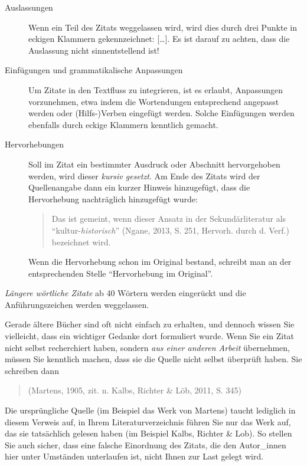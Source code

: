 \documentclass[ngerman,bibliography=totoc,oneside,12pt,a4paper]{scrbook}
\begin{document}
\begin{description}
\item[Auslassungen]
Wenn ein Teil des Zitats weggelassen wird, wird dies durch drei Punkte
in eckigen Klammern gekennzeichnet: {[}\ldots{}{]}. Es ist darauf zu
achten, dass die Auslassung nicht sinnentstellend ist!
\item[Einfügungen und grammatikalische Anpassungen]
Um Zitate in den Textfluss zu integrieren, ist es erlaubt, Anpassungen
vorzunehmen, etwa indem die Wortendungen entsprechend angepasst werden
oder (Hilfs-)Verben eingefügt werden. Solche Einfügungen werden
ebenfalls durch eckige Klammern kenntlich gemacht.
\item[Hervorhebungen]
Soll im Zitat ein bestimmter Ausdruck oder Abschnitt hervorgehoben
werden, wird dieser \emph{kursiv gesetzt}. Am Ende des Zitats wird der
Quellenangabe dann ein kurzer Hinweis hinzugefügt, dass die Hervorhebung
nachträglich hinzugefügt wurde:

\begin{quote}
Das ist gemeint, wenn dieser Ansatz in der Sekundärliteratur als
\enquote{kultur-\emph{historisch}} (Ngane, 2013, S. 251, Hervorh. durch
d. Verf.) bezeichnet wird.
\end{quote}

Wenn die Hervorhebung schon im Original bestand, schreibt man an der
entsprechenden Stelle \enquote{Hervorhebung im Original}.
\end{description}

\emph{Längere wörtliche Zitate} ab 40 Wörtern werden eingerückt und die
Anführungszeichen werden weggelassen.

Gerade ältere Bücher sind oft nicht einfach zu erhalten, und dennoch
wissen Sie vielleicht, dass ein wichtiger Gedanke dort formuliert wurde.
Wenn Sie ein Zitat nicht selbst recherchiert haben, sondern \emph{aus
einer anderen Arbeit} übernehmen, müssen Sie kenntlich machen, dass sie
die Quelle nicht selbst überprüft haben. Sie schreiben dann

\begin{quote}
(Martens, 1905, zit. n. Kalbs, Richter \& Löb, 2011, S. 345)
\end{quote}

Die ursprüngliche Quelle (im Beispiel das Werk von Martens) taucht
lediglich in diesem Verweis auf, in Ihrem Literaturverzeichnis führen
Sie nur das Werk auf, das sie tatsächlich gelesen haben (im Beispiel
Kalbs, Richter \& Lob). So stellen Sie auch sicher, dass eine falsche
Einordnung des Zitats, die den Autor\_innen hier unter Umständen
unterlaufen ist, nicht Ihnen zur Last gelegt wird.
\end{document}
